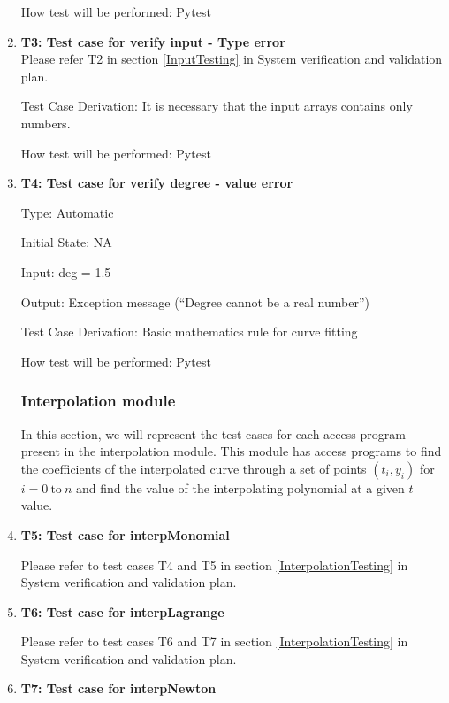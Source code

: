 \documentclass[12pt, titlepage]{article}
\begin{document}
\begin{enumerate}
How test will be performed: Pytest


\item{\textbf{T3: Test case for verify input - Type error}}\\
Please refer T2 in section \ref{InputTesting} in System verification and 
validation plan.
					

Test Case Derivation: It is necessary that the input arrays contains only 
numbers.

How test will be performed: Pytest


\item{\textbf{T4: Test case for verify degree - value error}}

Type: Automatic

Initial State: NA 

Input: deg = 1.5 

Output: Exception message (``Degree cannot be a real number'')

Test Case Derivation: Basic mathematics rule for curve fitting 

How test will be performed: Pytest


    
\subsubsection{Interpolation module}

In this section, we will represent the test cases for each access program 
present in the interpolation module. This module has access programs to find 
the coefficients of the interpolated curve through a set of points $(t_i,y_i)$ 
for $i = 0\ \text{to}\ n$ and find the value of the interpolating polynomial at 
a given $t$ value.

\item{\textbf{T5: Test case for interpMonomial}}

Please refer to test cases T4 and T5 in section \ref{InterpolationTesting} in 
System verification 
and 
validation plan.


\item{\textbf{T6: Test case for interpLagrange}}

Please refer to test cases T6 and T7 in section \ref{InterpolationTesting} in 
System verification 
and 
validation plan.


\item{\textbf{T7: Test case for interpNewton}}


\end{enumerate}
\end{document}
